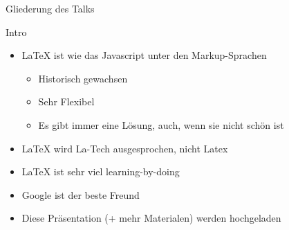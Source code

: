 \documentclass[main.tex]{subfiles}
\begin{document}
\begin{frame}
    \titlepage
\end{frame}

\begin{frame}{Gliederung des Talks}
    \begin{tcolorbox}[colback=red!7,colframe=red!50!black,rounded corners]
        \vspace{5pt}
        \tableofcontents[sections={1-3}]
    \end{tcolorbox}
    \vspace{10pt}
    \begin{tcolorbox}[colback=red!7,colframe=red!50!black,rounded corners]
        \vspace{5pt}
        \tableofcontents[sections={4-6}]
    \end{tcolorbox}
\end{frame}

\begin{frame}{Intro}
    \begin{itemize}
        \item \LaTeX{} ist wie das Javascript unter den Markup-Sprachen
        \pause
        \begin{itemize}
            \item Historisch gewachsen
            \pause
            \item Sehr Flexibel
            \pause
            \item Es gibt immer eine Lösung\pause, auch, wenn sie nicht schön ist
        \end{itemize}
        \pause
        \medskip
        \item \LaTeX{} wird La-Tech ausgesprochen, nicht Latex
        \pause
        \item \LaTeX{} ist sehr viel learning-by-doing
        \pause
        \medskip
        \item Google ist der beste Freund  \phantom{(}  %
        \pause
        \pause
        \item Diese Präsentation (+ mehr Materialen) werden hochgeladen
    \end{itemize}
\end{frame}
\end{document}
